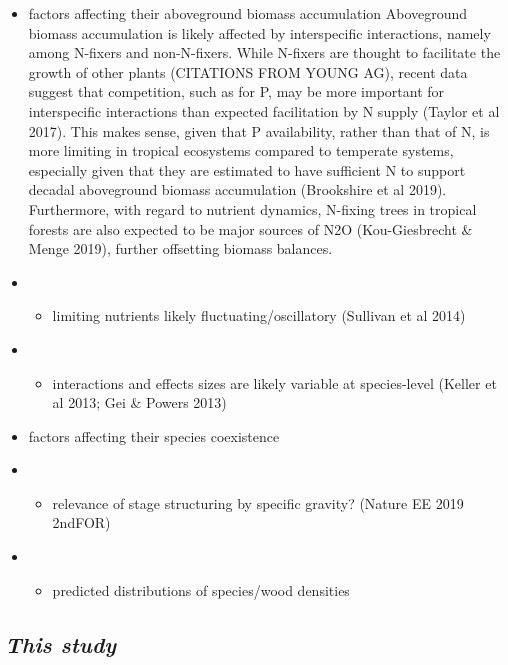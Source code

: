 \documentclass[]{article}
\providecommand{\tightlist}{%
  \setlength{\itemsep}{0pt}\setlength{\parskip}{0pt}}
\begin{document}
\begin{itemize}
\item
  factors affecting their aboveground biomass accumulation Aboveground
  biomass accumulation is likely affected by interspecific interactions,
  namely among N-fixers and non-N-fixers. While N-fixers are thought to
  facilitate the growth of other plants (CITATIONS FROM YOUNG AG),
  recent data suggest that competition, such as for P, may be more
  important for interspecific interactions than expected facilitation by
  N supply (Taylor et al 2017). This makes sense, given that P
  availability, rather than that of N, is more limiting in tropical
  ecosystems compared to temperate systems, especially given that they
  are estimated to have sufficient N to support decadal aboveground
  biomass accumulation (Brookshire et al 2019). Furthermore, with regard
  to nutrient dynamics, N-fixing trees in tropical forests are also
  expected to be major sources of N2O (Kou-Giesbrecht \& Menge 2019),
  further offsetting biomass balances.
\item
  \begin{itemize}
  \tightlist
  \item
    limiting nutrients likely fluctuating/oscillatory (Sullivan et al
    2014)
  \end{itemize}
\item
  \begin{itemize}
  \tightlist
  \item
    interactions and effects sizes are likely variable at species-level
    (Keller et al 2013; Gei \& Powers 2013)
  \end{itemize}
\item
  factors affecting their species coexistence
\item
  \begin{itemize}
  \tightlist
  \item
    relevance of stage structuring by specific gravity? (Nature EE 2019
    2ndFOR)
  \end{itemize}
\item
  \begin{itemize}
  \tightlist
  \item
    predicted distributions of species/wood densities
  \end{itemize}
\end{itemize}

\hypertarget{this-study}{%
\subsection{\texorpdfstring{\emph{This
study}}{This study}}\label{this-study}}
\end{document}

